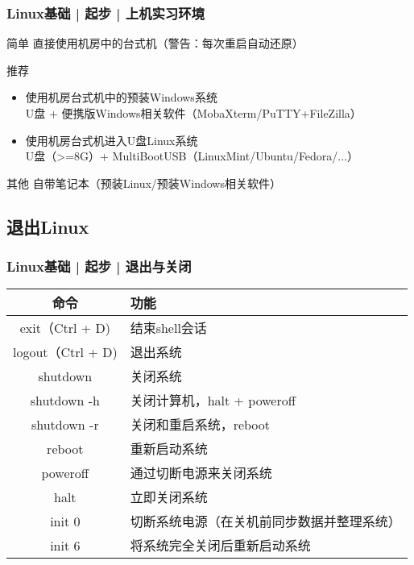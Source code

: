 \begin{frame}
  \frametitle{Linux基础 | 起步 | 上机实习环境}
  \begin{block}{简单}
    直接使用机房中的台式机（\alert{警告：每次重启自动还原}）
  \end{block}
  \pause
  \begin{block}{推荐}
    \begin{itemize}
      \item 使用机房台式机中的预装Windows系统\\ \quad U盘 + 便携版Windows相关软件（MobaXterm/PuTTY+FileZilla）
      \item 使用机房台式机进入U盘Linux系统\\ \quad U盘（>=8G）+ MultiBootUSB（LinuxMint/Ubuntu/Fedora/...）
    \end{itemize}
  \end{block}
  \pause
  \begin{block}{其他}
    自带笔记本（预装Linux/预装Windows相关软件）
  \end{block}
\end{frame}

\subsection{退出Linux}
\begin{frame}
  \frametitle{Linux基础 | 起步 | 退出与关闭}
  \begin{table}
    \centering
    \begin{tabular}{cl}
      \hline
      \rowcolor{blue!50}命令 & 功能\\
      \hline
      exit（Ctrl + D) & 结束shell会话\\
      logout（Ctrl + D) & 退出系统\\
      \hline
      shutdown & 关闭系统\\
      \alert{shutdown -h} & 关闭计算机，halt + poweroff\\
      shutdown -r & 关闭和重启系统，reboot\\
      \alert{reboot} & 重新启动系统\\
      poweroff & 通过切断电源来关闭系统\\
      halt & 立即关闭系统\\
      init 0 & 切断系统电源（在关机前同步数据并整理系统）\\
      init 6 & 将系统完全关闭后重新启动系统\\
      \hline
    \end{tabular}
  \end{table}
\end{frame}

